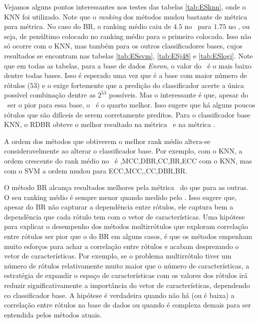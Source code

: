 Vejamos alguns pontos interessantes nos testes das tabelas
\ref{tab:ESknn}, onde o KNN foi utilizado.
Note que o \textit{ranking} dos métodos mudou bastante de métrica para métrica.
No caso do BR, o ranking médio caiu de $4.5$ no \SA~para $1.75$ no \HL, ou seja,
de penúltimo colocado no ranking médio para o primeiro colocado. 
Isso não só ocorre com o KNN, mas também para os outros classificadores bases, cujos resultados
se encontram nas tabelas
\ref{tab:ESsvm}, \ref{tab:ESj48} e \ref{tab:ESlogi}.
Note que em todas as tabelas, para a base de dados \textit{Enron},
o valor do \SA~é o mais baixo dentre todas bases.
Isso é esperado uma vez que é a base com maior número de rótulos ($53$) e o \SA
exige fortemente que a predição do classificador acerte a única possível combinação dentre as $2^{53}$ possíveis.
Mas o interessante é que, apesar do \SA~ser o pior para essa base, o \HL~é o quarto melhor.
Isso sugere que há alguns poucos rótulos que são difíceis de serem corretamente preditos.
Para o classificador base KNN, o RDBR obteve o melhor resultado na métrica \SA~e na métrica \EBA.

A ordem dos métodos que obtiverem o melhor rank médio altera-se consideravelmente
ao alterar o classificador base.
Por exemplo, com o KNN, a ordem crescente do rank médio no \SA~é \MRLMa,MCC,DBR,CC,BR,ECC com o KNN,
mas com o SVM a ordem mudou para ECC,MCC,\MRLMa,CC,DBR,BR.

O método BR alcança resultados melhores pela métrica \HL~do que para as outras.
O seu ranking médio é sempre menor quando medido pelo \HL. Isso sugere que, apesar
do BR não capturar a dependência entre rótulos, ele captura bem a dependência
que cada rótulo tem com o vetor de características. Uma hipótese para explicar
o desempenho dos métodos multirrótulos que exploram correlação entre rótulos ser
pior que o do BR em alguns casos, é que os métodos empenham muito esforços para 
achar a correlação entre rótulos e acabam desprezando o vetor de características. 
Por exemplo, se o problema multirrótulo tiver um número de rótulos relativamente muito maior 
que o número de características, a estratégia de expandir o espaço de características com 
os valores dos rótulos irá reduzir significativamente a importância do vetor de características, 
dependendo co classificador base. A hipótese é verdadeira quando não há (ou é baixa) a correlação entre rótulos
na base de dados ou quando é complexa demais para ser entendida pelos métodos atuais.

